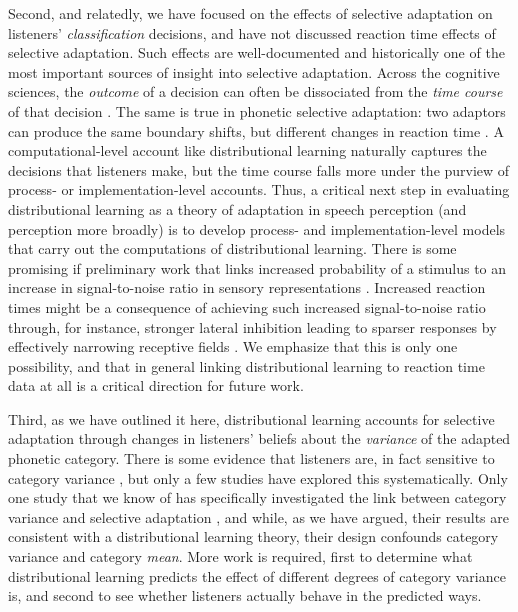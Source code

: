 Second, and relatedly, we have focused on the effects of selective adaptation on listeners' \emph{classification} decisions, and have not discussed reaction time effects of selective adaptation.  Such effects are well-documented \autocite{Samuel1986,Samuel1996} and historically one of the most important sources of insight into selective adaptation.  Across the cognitive sciences, the \emph{outcome} of a decision can often be dissociated from the \emph{time course} of that decision \autocite[see, e.g., the related discussion for lexical selection in speech production;][]{Mahon2007,Oppenheim2010}.  The same is true in phonetic selective adaptation: two adaptors can produce the same boundary shifts, but different changes in reaction time \autocite{Samuel1996}.  A computational-level account like distributional learning naturally captures the decisions that listeners make, but the time course falls more under the purview of process- or implementation-level accounts.  Thus, a critical next step in evaluating distributional learning as a theory of adaptation in speech perception (and perception more broadly) is to develop process- and implementation-level models that carry out the computations  of distributional learning.  There is some promising if preliminary work that links increased probability of a stimulus to an increase in signal-to-noise ratio in sensory representations \autocite{Stocker2006,Wei2012}.  Increased reaction times might be a consequence of achieving such increased signal-to-noise ratio through, for instance, stronger lateral inhibition leading to sparser responses by effectively narrowing receptive fields \autocite{Gardner2004}.  We emphasize that this is only one possibility, and that in general linking distributional learning to reaction time data at all is a critical direction for future work.

Third, as we have outlined it here, distributional learning accounts for selective adaptation through changes in listeners' beliefs about the \emph{variance} of the adapted phonetic category.  There is some evidence that listeners are, in fact sensitive to category variance \autocite{Clayards2008,Cole1977,Newman2001,Schreiber2013}, but only a few studies have explored this systematically.  Only one study that we know of has specifically investigated the link between category variance and selective adaptation \autocite{Cole1977}, and while, as we have argued, their results are consistent with a distributional learning theory, their design confounds category variance and category \emph{mean}.  More work is required, first to determine what distributional learning predicts the effect of different degrees of category variance is, and second to see whether listeners actually behave in the predicted ways.

